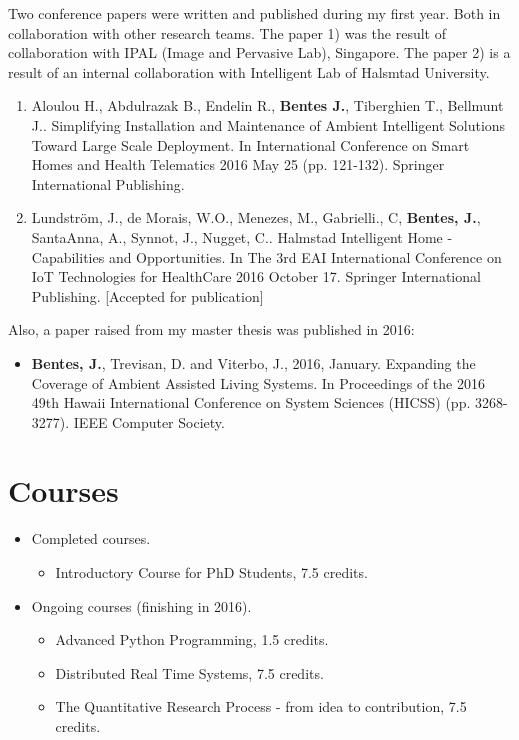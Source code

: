 \documentclass[]{report}
\begin{document}
Two conference papers were written and published during my first year. Both in collaboration with other research teams. The paper 1) was the result of collaboration with IPAL (Image and Pervasive Lab), Singapore. The paper 2) is a result of an internal collaboration with Intelligent Lab of Halsmtad University.

\begin{enumerate}
	\item Aloulou H., Abdulrazak B., Endelin R., \textbf{Bentes J.}, Tiberghien T., Bellmunt J.. Simplifying Installation and Maintenance of Ambient Intelligent Solutions Toward Large Scale Deployment. In International Conference on Smart Homes and Health Telematics 2016 May 25 (pp. 121-132). Springer International Publishing.
	\item Lundstr\"{o}m, J., de Morais, W.O., Menezes, M., Gabrielli., C, \textbf{Bentes, J.}, SantaAnna, A., Synnot, J., Nugget, C.. Halmstad Intelligent Home - Capabilities and Opportunities. In The 3rd EAI International Conference on IoT Technologies for HealthCare 2016 October 17. Springer International Publishing. [Accepted for publication]
\end{enumerate}

\noindent Also, a paper raised from my master thesis was published in 2016:

\begin{itemize}
	\item \textbf{Bentes, J.}, Trevisan, D. and Viterbo, J., 2016, January. Expanding the Coverage of Ambient Assisted Living Systems. In Proceedings of the 2016 49th Hawaii International Conference on System Sciences (HICSS) (pp. 3268-3277). IEEE Computer Society. 
\end{itemize}

\section*{Courses}

\begin{itemize} 
	\item Completed courses.
	\begin{itemize}
		\item Introductory Course for PhD Students, 7.5 credits.
	\end{itemize}	
	\item Ongoing courses (finishing in 2016).
		\begin{itemize}
			\item Advanced Python Programming, 1.5 credits.
			\item Distributed Real Time Systems, 7.5 credits.
			\item The Quantitative Research Process - from idea to contribution, 7.5 credits.
		\end{itemize}
\end{itemize}
\end{document}
